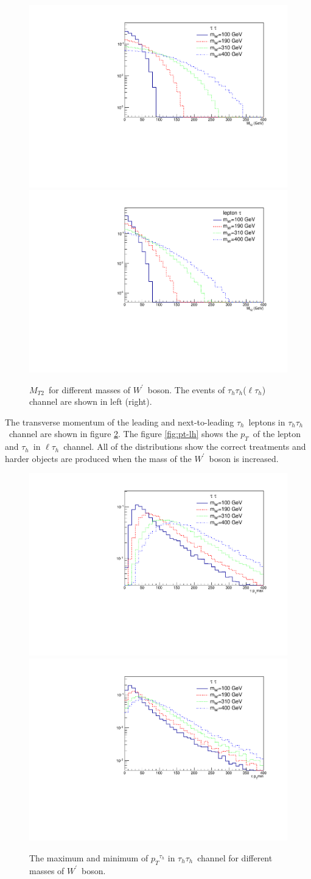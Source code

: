 \documentclass[preprint,showpacs,preprintnumbers]{revtex4}
\newcommand{\wprime}{\ensuremath{W^\prime}~}
\newcommand{\Tau}{\ensuremath{\tau_h}}
\newcommand{\tauTau}{\ensuremath{\tau_h\tau_h}}
\newcommand{\lepTau}{\ensuremath{\ell\tau_h}}
\newcommand{\pt}{\ensuremath{p_T}}
\newcommand{\mttwo}{\ensuremath{M_{T2}}}
\begin{document}
\begin{figure}[htb]
	\centering
	\includegraphics*[width=.45\textwidth]{MT2_hh.pdf}
	\hspace{3mm}
	\includegraphics*[width=.45\textwidth]{MT2_lh.pdf}
	\caption{\mttwo ~for different masses of \wprime boson. The events of \tauTau (\lepTau) channel are shown in left (right).}
	\label{fig:mt2}
\end{figure} 
The transverse momentum of the leading and next-to-leading \Tau ~leptons in \tauTau ~channel are shown in figure \ref{fig:pt-hh}. The figure \ref{fig:pt-lh} shows the \pt ~of the lepton and \Tau ~in \lepTau ~channel. All of the distributions show the correct treatments and harder objects are produced when the mass of the \wprime boson is increased.
\begin{figure}[htb]
	\centering
	\includegraphics*[width=.45\textwidth]{Pt_hh_max.pdf}
	\hspace{3mm}
	\includegraphics*[width=.45\textwidth]{Pt_hh_min.pdf}
	\caption{The maximum  and minimum of $\pt^{\Tau}$ in \tauTau ~channel for different masses of \wprime boson.}
	\label{fig:pt-hh}
\end{figure}
\end{document}
